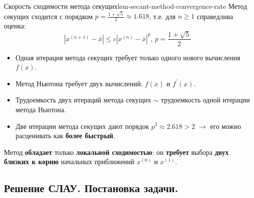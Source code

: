 \documentclass[14pt]{extarticle}
\begin{document}
    \clearpage
    \begin{lemma}{Скорость сходимости метода секущих}{lem-secant-method-convergence-rate}
        Метод секущих сходится с порядком $p = \frac{1 + \sqrt{5}}{2} \approx 1.618$, т.е. для $n \geq 1$ справедлива оценка:
        $$|x^{(n + 1)} - \overline{x}| \leq c|x^{(n)} - \overline{x}|^{p} \text{, } p = \frac{1 + \sqrt{5}}{2}$$

        \begin{itemize}
            \item Одная итерация метода секущих требует только одного нового вычисления $f(x)$.
            \item Метод Ньютона требует двух вычислений: $f(x)$ и $f^{'}(x)$.
            \item Трудоемкость двух итераций метода секущих $\sim$ трудоемкость одной итерации метода Ньютона.
            \item Две итерации метода секущих дают порядок $p^{2} \approx 2.618 > 2$ $\rightarrow$ его можно расценивать как \textbf{более быстрый}.
        \end{itemize}
    \end{lemma}

    Метод \textbf{обладает} только \textbf{локальной сходимостью}: он \textbf{требует} выбора \textbf{двух близких к корню} начальных приближений $x^{(0)}$ и $x^{(1)}$.

\clearpage
\subsection{Решение СЛАУ. Постановка задачи.}
\end{document}
